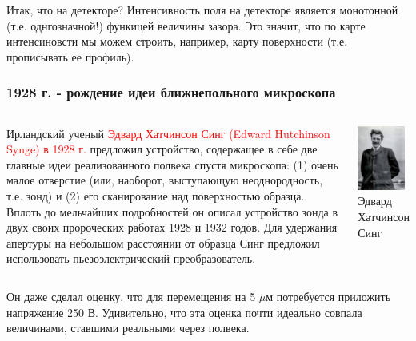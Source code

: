 \documentclass[9pt, compress, xcolor=table]{beamer}
\begin{document}
\begin{frame}{Итак, что на детекторе?}
Интенсивность поля на детекторе является монотонной (т.е. однгозначной!) функицей величины зазора. Это значит, что по карте интенсиновсти мы можем строить, например, карту поверхности (т.е. прописывать ее профиль).

\end{frame}

\begin{frame}[fragile]
\frametitle{1928 г. - рождение идеи ближнепольного микроскопа}
\begin{columns}[c]
\column{7cm}

Ирландский ученый \textcolor{red}{Эдвард Хатчинсон Синг (Edward Hutchinson Synge) в 1928 г.} предложил устройство, содержащее в себе две главные идеи реализованного полвека спустя микроскопа: (1) очень малое отверстие (или, наоборот, выступающую неоднородность, т.е. зонд) и (2) его сканирование над поверхностью образца. Вплоть до мельчайших подробностей он описал устройство зонда в двух своих пророческих работах 1928 и 1932 годов. Для удержания апертуры на небольшом расстоянии от образца Синг предложил использовать пьезоэлектрический преобразователь.

\column{5cm}
\begin{center}
\includegraphics[width=0.9\textwidth]{ehs}
\\\scriptsize{Эдвард Хатчинсон Синг}
\end{center}
\end{columns}

\small{Он даже сделал оценку, что для перемещения на 5 $\mu$м потребуется приложить напряжение 250 В. Удивительно, что эта оценка почти идеально совпала величинами, ставшими реальными через  полвека.}
\end{frame}
\end{document}
